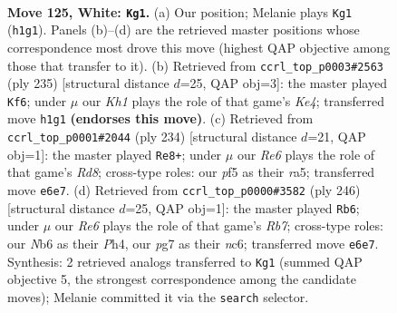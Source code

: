 \documentclass[11pt]{article}
\begin{document}
\clearpage

\begin{figure}[p]\centering
\begin{subfigure}{0.46\textwidth}\centering
\resizebox{\linewidth}{!}{%
\newchessgame
\chessboard[
  setfen={7r/6pk/1N2R3/5p1p/7P/6P1/8/7K w - - 8 125},
  showmover=false,
  pgfstyle=straightmove, color=movearrow, markmove={h1-g1}
]}
\caption{}
\end{subfigure}\hfill
\begin{subfigure}{0.46\textwidth}\centering
\resizebox{\linewidth}{!}{%
\newchessgame
\chessboard[
  setfen={8/8/r6p/4k2p/7P/4RKP1/8/8 b - - 7 118},
  showmover=false,
  pgfstyle=straightmove, color=movearrow, markmove={e5-f6}
]}
\caption{}
\end{subfigure}
\\[4pt]
\begin{subfigure}{0.46\textwidth}\centering
\resizebox{\linewidth}{!}{%
\newchessgame
\chessboard[
  setfen={3R4/8/8/r7/4k2p/4p2P/6P1/4K3 w - - 14 118},
  showmover=false,
  pgfstyle=straightmove, color=movearrow, markmove={d8-e8}
]}
\caption{}
\end{subfigure}\hfill
\begin{subfigure}{0.46\textwidth}\centering
\resizebox{\linewidth}{!}{%
\newchessgame
\chessboard[
  setfen={7B/1R6/2n1k1p1/5p2/7P/5PP1/3r4/5K2 w - - 33 124},
  showmover=false,
  pgfstyle=straightmove, color=movearrow, markmove={b7-b6}
]}
\caption{}
\end{subfigure}
\caption{\textbf{Move 125, White: \texttt{Kg1}.} (a) Our position; Melanie plays \texttt{Kg1} (\texttt{h1g1}). Panels (b)--(d) are the retrieved master positions whose correspondence most drove this move (highest QAP objective among those that transfer to it). (b) Retrieved from \texttt{ccrl\_top\_p0003\#2563} (ply 235) [structural distance $d$=25, QAP obj=3]: the master played \texttt{Kf6}; under $\mu$ our \emph{Kh1} plays the role of that game's \emph{Ke4}; transferred move \texttt{h1g1} \textbf{(endorses this move)}. (c) Retrieved from \texttt{ccrl\_top\_p0001\#2044} (ply 234) [structural distance $d$=21, QAP obj=1]: the master played \texttt{Re8+}; under $\mu$ our \emph{Re6} plays the role of that game's \emph{Rd8}; cross-type roles: our \emph{p}f5 as their \emph{r}a5; transferred move \texttt{e6e7}. (d) Retrieved from \texttt{ccrl\_top\_p0000\#3582} (ply 246) [structural distance $d$=25, QAP obj=1]: the master played \texttt{Rb6}; under $\mu$ our \emph{Re6} plays the role of that game's \emph{Rb7}; cross-type roles: our \emph{N}b6 as their \emph{P}h4, our \emph{p}g7 as their \emph{n}c6; transferred move \texttt{e6e7}. Synthesis: 2 retrieved analogs transferred to \texttt{Kg1} (summed QAP objective 5, the strongest correspondence among the candidate moves); Melanie committed it via the \texttt{search} selector.}
\label{fig:thought-m248}
\end{figure}
\end{document}
